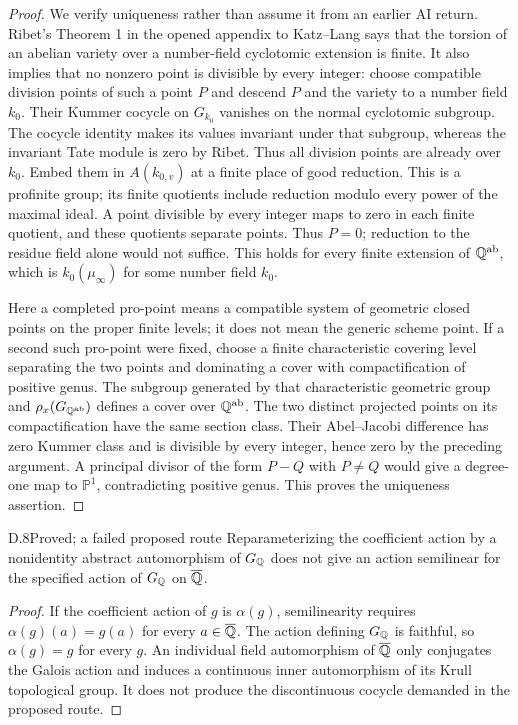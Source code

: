 \begin{proof}
We verify uniqueness rather than assume it from an earlier AI
return. Ribet's Theorem 1 in the opened appendix to Katz--Lang
\citep{D_Ribet1981} says that the torsion of an abelian variety over
a number-field cyclotomic extension is finite. It also implies
that no nonzero point is divisible by every integer: choose
compatible division points of such a point $P$ and descend $P$
and the variety to a number field $k_0$. Their Kummer cocycle on
$G_{k_0}$ vanishes on the normal cyclotomic subgroup. The cocycle
identity makes its values invariant under that subgroup, whereas
the invariant Tate module is zero by Ribet. Thus all division
points are already over $k_0$. Embed them in $A(k_{0,v})$ at a
finite place of good reduction. This is a profinite group; its
finite quotients include reduction modulo every power of the
maximal ideal. A point divisible by every integer maps to zero
in each finite quotient, and these quotients separate points.
Thus $P=0$; reduction to the residue field alone would not suffice.
This holds for every finite extension of $\mathbb Q^{\mathrm{ab}}$,
which is $k_0(\mu_\infty)$ for some number field $k_0$.

Here a completed pro-point means a compatible system of geometric
closed points on the proper finite levels; it does not mean the
generic scheme point. If a second such pro-point were fixed, choose a finite
characteristic covering level separating the two points and
dominating a cover with compactification of positive genus.
The subgroup generated by that characteristic geometric group
and $\rho_x(G_{\mathbb Q^{\mathrm{ab}}})$ defines a cover over
$\mathbb Q^{\mathrm{ab}}$. The two distinct projected points on its
compactification have the same section class. Their Abel--Jacobi
difference has zero Kummer class and is divisible by every integer,
hence zero by the preceding argument. A principal divisor of the
form $P-Q$ with $P\ne Q$ would give a degree-one map to
$\mathbb P^1$, contradicting positive genus. This proves the
uniqueness assertion.
\end{proof}

\begin{claim}{D.8}{Proved; a failed proposed route}
Reparameterizing the coefficient action by a nonidentity abstract
automorphism of $G_\mathbb Q$ does not give an action semilinear for the
specified action of $G_\mathbb Q$ on $\overline{\mathbb Q}$.
\end{claim}
\begin{proof}
If the coefficient action of $g$ is $\alpha(g)$, semilinearity
requires $\alpha(g)(a)=g(a)$ for every $a\in\overline{\mathbb Q}$.
The action defining $G_\mathbb Q$ is faithful, so $\alpha(g)=g$ for
every $g$. An individual field automorphism of $\overline{\mathbb Q}$
only conjugates the Galois action and induces a continuous inner
automorphism of its Krull topological group. It does not produce
the discontinuous cocycle demanded in the proposed route.
\end{proof}

